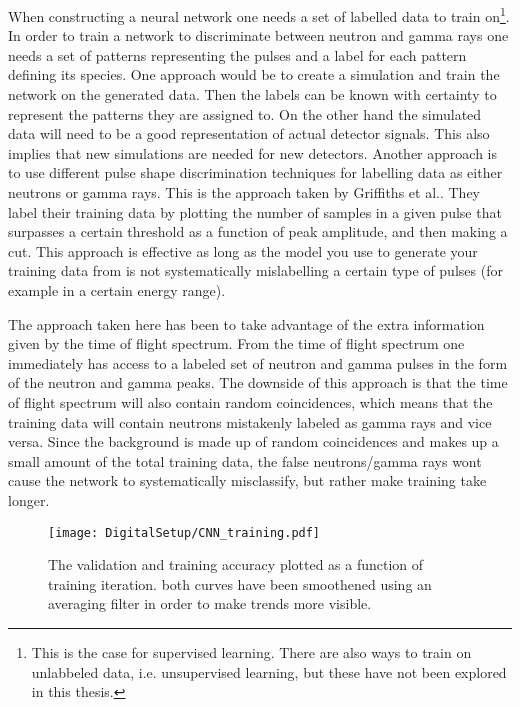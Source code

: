 \documentclass[main.tex]{subfiles}
\begin{document}
When constructing a neural network one needs a set of labelled data to train on\footnote{This is the case for supervised learning. There are also ways to train on unlabbeled data, i.e. unsupervised learning, but these have not been explored in this thesis.}. In order to train a network to discriminate between neutron and gamma rays one needs a set of patterns representing the pulses and a label for each pattern defining its species. One approach would be to create a simulation and train the network on the generated data. Then the labels can be known with certainty to represent the patterns they are assigned to. On the other hand the simulated data will need to be a good representation of actual detector signals. This also implies that new simulations are needed for new detectors. Another approach is to use different pulse shape discrimination techniques for labelling data as either neutrons or gamma rays. This is the approach taken by  Griffiths et al.\cite{Griffiths}. They label their training data by plotting the number of samples in a given pulse that surpasses a certain threshold as a function of peak amplitude, and then making a cut. This approach is effective as long as the model you use to generate your training data from is not systematically mislabelling a certain type of pulses (for example in a certain energy range). 

The approach taken here has been to take advantage of the extra information given by the time of flight spectrum. From the time of flight spectrum one immediately has access to a labeled set of neutron and gamma pulses in the form of the neutron and gamma peaks. The downside of this approach is that the time of flight spectrum will also contain random coincidences, which means that the training data will contain neutrons mistakenly labeled as gamma rays and vice versa. Since the background is made up of random coincidences and makes up a small amount of the total training data, the false neutrons/gamma rays wont cause the network to systematically misclassify, but rather make training take longer.

\begin{figure}[ht!]
    \centering
        \texttt{[image: DigitalSetup/CNN\_training.pdf]}
        \caption{The validation and training accuracy plotted as a function of training iteration. both curves have been smoothened using an averaging filter in order to make trends more visible.}
    \label{fig:CNN_training} 
\end{figure}
\end{document}
